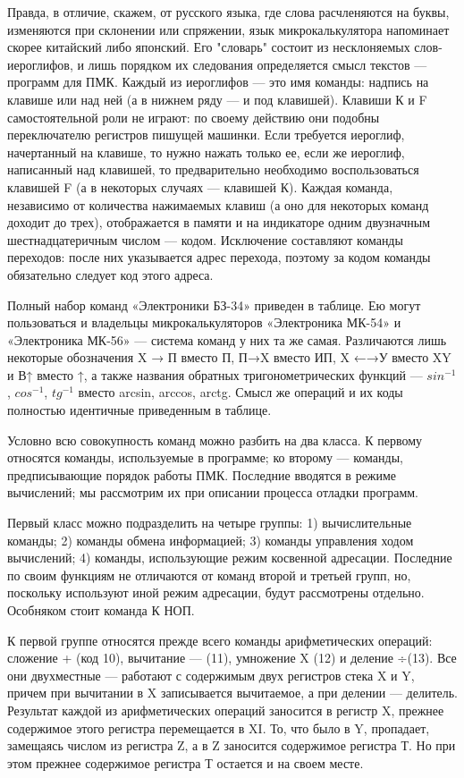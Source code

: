 \documentclass[11pt,a4paper,oneside]{article}
\begin{document}
Правда, в отличие, скажем, от русского языка, где слова расчленяются на буквы, изменяются при склонении или спряжении, язык микрокалькулятора напоминает скорее китайский либо японский. Его "словарь" состоит из несклоняемых слов-иероглифов, и лишь порядком их следования определяется смысл текстов — программ для ПМК. Каждый из иероглифов — это имя команды: надпись на клавише или над ней (а в нижнем ряду — и под клавишей). Клавиши К и F самостоятельной роли не играют: по своему действию они подобны переключателю регистров пишущей машинки. Если требуется иероглиф, начертанный на клавише, то нужно нажать только ее, если же иероглиф, написанный над клавишей, то предварительно необходимо воспользоваться клавишей F (а в некоторых случаях — клавишей К). Каждая команда, независимо от количества нажимаемых клавиш (а оно для некоторых команд доходит до трех), отображается в памяти и на индикаторе одним двузначным шестнадцатеричным числом — кодом. Исключение составляют команды переходов: после них указывается адрес перехода, поэтому за кодом команды обязательно следует код этого адреса.

Полный набор команд «Электроники БЗ-34» приведен в таблице. Ею могут пользоваться и владельцы микрокалькуляторов «Электроника МК-54» и «Электроника МК-56» — система команд у них та же самая. Различаются лишь некоторые обозначения X → П вместо П, П→X вместо ИП, X ←→У вместо XY и В↑ вместо ↑, а также названия обратных тригонометрических функций — $sin^{-1}$, $cos^{-1}$, $tg^{-1}$ вместо arcsin, arccos, arctg. Смысл же операций и их коды полностью идентичные приведенным в таблице.

Условно всю совокупность команд можно разбить на два класса. К первому относятся команды, используемые в программе; ко второму — команды, предписывающие порядок работы ПМК. Последние вводятся в режиме вычислений; мы рассмотрим их при описании процесса отладки программ.

Первый класс можно подразделить на четыре группы: 1) вычислительные команды; 2) команды обмена информацией; 3) команды управления ходом вычислений; 4) команды, использующие режим косвенной адресации. Последние по своим функциям не отличаются от команд второй и третьей групп, но, поскольку используют иной режим адресации, будут рассмотрены отдельно. Особняком стоит команда К НОП.

К первой группе относятся прежде всего команды арифметических операций: сложение + (код 10), вычитание — (11), умножение X (12) и деление ÷(13). Все они двухместные — работают с содержимым двух регистров стека X и Y, причем при вычитании в X записывается вычитаемое, а при делении — делитель. Результат каждой из арифметических операций заносится в регистр X, прежнее содержимое этого регистра перемещается в XI. То, что было в Y, пропадает, замещаясь числом из регистра Z, а в Z заносится содержимое регистра Т. Но при этом прежнее содержимое регистра Т остается и на своем месте.
\end{document}
